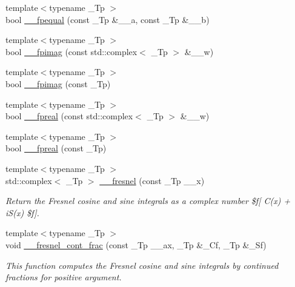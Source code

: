 \begin{DoxyCompactItemize}
{\footnotesize template$<$typename \+\_\+\+Tp $>$ }\\bool \hyperlink{namespacestd_1_1____detail_acefbc7637e41168e49d6230df9c5127f}{\+\_\+\+\_\+fpequal} (const \+\_\+\+Tp \&\+\_\+\+\_\+a, const \+\_\+\+Tp \&\+\_\+\+\_\+b)
\item 
{\footnotesize template$<$typename \+\_\+\+Tp $>$ }\\bool \hyperlink{namespacestd_1_1____detail_a990a8fb06307793ceae4c3c288f8b876}{\+\_\+\+\_\+fpimag} (const std\+::complex$<$ \+\_\+\+Tp $>$ \&\+\_\+\+\_\+w)
\item 
{\footnotesize template$<$typename \+\_\+\+Tp $>$ }\\bool \hyperlink{namespacestd_1_1____detail_a962bc8055b3948b6e2bebf34f86d9263}{\+\_\+\+\_\+fpimag} (const \+\_\+\+Tp)
\item 
{\footnotesize template$<$typename \+\_\+\+Tp $>$ }\\bool \hyperlink{namespacestd_1_1____detail_ab78bb436e256ef9a3f64fa2a1ce25fb1}{\+\_\+\+\_\+fpreal} (const std\+::complex$<$ \+\_\+\+Tp $>$ \&\+\_\+\+\_\+w)
\item 
{\footnotesize template$<$typename \+\_\+\+Tp $>$ }\\bool \hyperlink{namespacestd_1_1____detail_a52087623539a401ded28ef1ca8fbcd04}{\+\_\+\+\_\+fpreal} (const \+\_\+\+Tp)
\item 
{\footnotesize template$<$typename \+\_\+\+Tp $>$ }\\std\+::complex$<$ \+\_\+\+Tp $>$ \hyperlink{namespacestd_1_1____detail_a322045015cfbde5a45e7718d533de60d}{\+\_\+\+\_\+fresnel} (const \+\_\+\+Tp \+\_\+\+\_\+x)
\begin{DoxyCompactList}\small\item\em Return the Fresnel cosine and sine integrals as a complex number \$f\mbox{[} C(x) + i\+S(x) \$f\mbox{]}. \end{DoxyCompactList}\item 
{\footnotesize template$<$typename \+\_\+\+Tp $>$ }\\void \hyperlink{namespacestd_1_1____detail_aeae8420e2fa1671f004066525adc99b6}{\+\_\+\+\_\+fresnel\+\_\+cont\+\_\+frac} (const \+\_\+\+Tp \+\_\+\+\_\+ax, \+\_\+\+Tp \&\+\_\+\+Cf, \+\_\+\+Tp \&\+\_\+\+Sf)
\begin{DoxyCompactList}\small\item\em This function computes the Fresnel cosine and sine integrals by continued fractions for positive argument. \end{DoxyCompactList}\item 

\end{DoxyCompactItemize}

